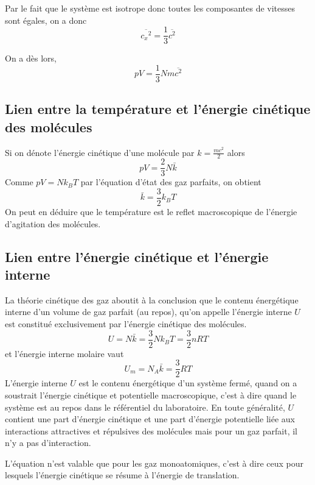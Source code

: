 Par le fait que le système est isotrope donc
toutes les composantes de vitesses sont égales, on a donc
\[  \overline{{c_x}^2} = \frac{1}{3}\overline{c^2} \]

On a dès lors,
\[ pV = \frac{1}{3}Nm\overline{c^2} \]


\subsection{Lien entre la température et l'énergie cinétique des molécules}
Si on dénote l'énergie cinétique d'une molécule par $k = \frac{mc^2}{2}$ alors
\[ pV = \frac 23 N\bar k \]
Comme $pV = Nk_BT$ par l'équation d'état des gaz parfaits, on obtient
\[ \bar k = \frac 32 k_B T \]
On peut en déduire que le température est
le reflet macroscopique de l'énergie d'agitation des molécules.

\subsection{Lien entre l'énergie cinétique et l'énergie interne}
La théorie cinétique des gaz aboutit à la conclusion que
le contenu énergétique interne d'un volume de gaz parfait (au repos),
qu'on appelle l'énergie interne $U$ est constitué exclusivement
par l'énergie cinétique des molécules.
\[ U = N\bar k = \frac 32 Nk_BT = \frac 32nRT \]
et l'énergie interne molaire vaut
\[ U_m = N_A\bar k = \frac 32 RT \]
L'énergie interne $U$ est le contenu énergétique d'un système fermé,
quand on a soustrait l'énergie cinétique et potentielle macroscopique,
c'est à dire quand le système est au repos dans le référentiel du laboratoire.
En toute généralité, $U$ contient une part d'énergie cinétique et
une part d'énergie potentielle liée aux interactions attractives et
répulsives des molécules mais pour un gaz parfait, il n'y a pas d'interaction.

L'équation n'est valable que pour les gaz monoatomiques,
c'est à dire ceux pour lesquels l'énergie cinétique se résume à
l'énergie de translation.

